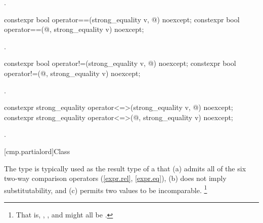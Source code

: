 \begin{itemdescr}
\pnum
\returns
{}.
\end{itemdescr}

%
\begin{itemdecl}
constexpr bool operator==(strong_equality v, @\unspec@) noexcept;
constexpr bool operator==(@\unspec@, strong_equality v) noexcept;
\end{itemdecl}

\begin{itemdescr}
\pnum
\returns
{}.
\end{itemdescr}

%
\begin{itemdecl}
constexpr bool operator!=(strong_equality v, @\unspec@) noexcept;
constexpr bool operator!=(@\unspec@, strong_equality v) noexcept;
\end{itemdecl}

\begin{itemdescr}
\pnum
\returns
{}.
\end{itemdescr}

%
\begin{itemdecl}
constexpr strong_equality operator<=>(strong_equality v, @\unspec@) noexcept;
constexpr strong_equality operator<=>(@\unspec@, strong_equality v) noexcept;
\end{itemdecl}

\begin{itemdescr}
\pnum
\returns
{}.
\end{itemdescr}

[cmp.partialord]{Class }

\pnum
The  type is typically used
as the result type of a 
that (a) admits all of the six two-way comparison operators (\ref{expr.rel}, \ref{expr.eq}),
(b) does not imply substitutability,
and (c) permits two values to be incomparable.%
\footnote{That is, , , and  might all be .}


